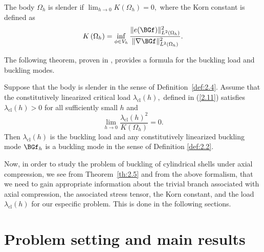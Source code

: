 \begin{definition}
\label{def:2.4}
The body $\Omega_{h}$ is slender if $\lim _{h \rightarrow 0} K\left(\Omega_{h}\right)=0,$ where the Korn constant is defined as
$$
K\left(\Omega_h \right)=\inf _{\phi \in V_h} \frac{\|e(\BGf)\|_{L^{2}\left(\Omega_{h}\right)}^{2}}{\|\nabla \BGf\|_{L^{2}\left(\Omega_{h}\right)}^{2}}.
$$
\end{definition}

The following theorem, proven in \cite{bib:Gra.Har.2}, provides a formula for the buckling load and buckling modes. 
\begin{theorem}
\label{th:2.5}
Suppose that the body is slender in the sense of Definition~\ref{def:2.4}. Assume that the constitutively linearized critical load $\lambda_{\mathrm{cl}}(h),$ defined in (\ref{2.11}) satisfies $\lambda_{\mathrm{cl}}(h)>0$ for all sufficiently small $h$ and
$$
\lim _{h \rightarrow 0} \frac{\lambda_{\mathrm{cl}}(h)^{2}}{K\left(\Omega_{h}\right)}=0.
$$
Then $\lambda_{\mathrm{cl}}(h)$ is the buckling load and any constitutively linearized buckling mode $\BGf_{h}$ is a buckling mode in the sense of Definition \ref{def:2.2}.
\end{theorem}

Now, in order to study the problem of buckling of cylindrical shells under axial compression, we see from Theorem~\ref{th:2.5} and from the above formalism, that we need to gain appropriate information about the trivial branch associated with axial compression, the associated stress tensor, the Korn constant, and the load 
$\lambda_{\mathrm{cl}}(h)$ for our especific problem.  This is done in the following sections. 



\section{Problem setting and main results}
\setcounter{equation}{0}
\label{sec:3}







